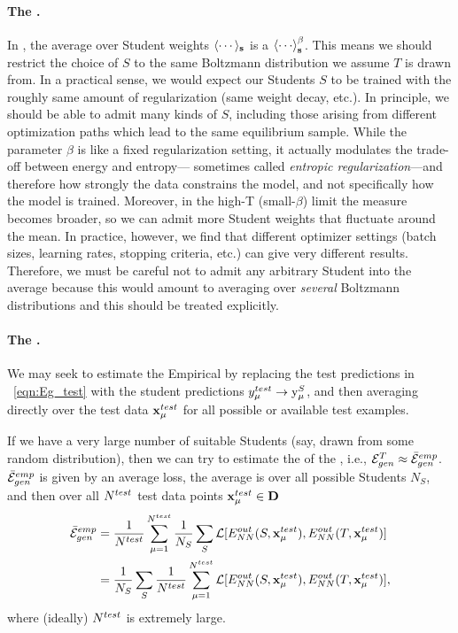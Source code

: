 \paragraph{The \ThermalAverage.} 
In \STATMECH, the average over Student weights $\langle\cdots\rangle_{{\mathbf{s}}}$ is a \ThermalAverage $\THRMAVG{\cdots}$.  This means we should restrict the choice of $S$ to the same Boltzmann distribution we assume $T$ is drawn from.  
In a practical sense, we would expect our Students $S$ to be trained with the roughly same amount of regularization (same weight decay, etc.). In principle, we should be able to admit many kinds of $S$, including those arising from
different optimization paths which lead to the same equilibrium sample. 
While the parameter $\beta$ is like a fixed regularization setting,
it actually modulates the trade-off between energy and entropy—
sometimes called \emph{entropic regularization}—and therefore how strongly the
data constrains the model, and not specifically how the model is trained.
Moreover, in the high-T (small-$\beta$) limit the
measure becomes broader, so we can admit more Student weights that fluctuate 
around the mean.
In practice, however, we find
that different optimizer settings (batch sizes, learning rates, stopping criteria, etc.)  can give very different results.   
Therefore, we must be careful not to admit any arbitrary Student into the average
because this would amount to averaging over \emph{several} Boltzmann distributions and this should
be treated explicitly.  


\paragraph{The \AverageGeneralizationError.}
We may seek to estimate the Empirical \AverageGeneralizationError
by replacing the test predictions in \EQN~\ref{eqn:Eg_test} with the student predictions
$y_{\mu}^{test}\rightarrow \mathrm{y}_{\mu}^{S}$, and then averaging directly over the test data $\mathbf{x}_{\mu}^{test}$
for all possible or available test examples.

If we have a very large number of suitable Students
(say, drawn from some random distribution), then we can try to estimate the 
\AverageGeneralizationError of the \Teacher, i.e., ${\mathcal{E}}_{gen}^{T}\approx\bar{\mathcal{E}}^{emp}_{gen}$.
$\bar{\mathcal{E}}^{emp}_{gen}$ is given by an average loss, the average is 
over all possible Students $N_S$,  and then  over all  $N^{test}$ test data points $\mathbf{x}_{\mu}^{test}\in\mathbf{D}$ 
\begin{align}
  \bar{\mathcal{E}}^{emp}_{gen}
  &=
  \frac{1}{N^{test}}\sum_{\mu=1}^{N^{test}}
  \frac{1}{N_S}\sum_{S}
  \mathcal{L}[E^{out}_{NN}(S,\mathbf{x}_{\mu}^{test}),E^{out}_{NN}(T,\mathbf{x}_{\mu}^{test})]  \\ \nonumber
    &=
  \frac{1}{N_S}\sum_{S}
    \frac{1}{N^{test}}\sum_{\mu=1}^{N^{test}}
    \mathcal{L}[E^{out}_{NN}(S,\mathbf{x}_{\mu}^{test}),E^{out}_{NN}(T,\mathbf{x}_{\mu}^{test})] ,
\label{eqn:emp_gen_error}
\end{align}
where (ideally) $N^{test}$ is extremely large.

